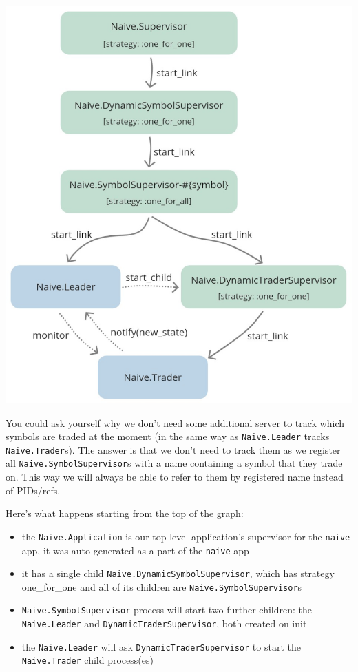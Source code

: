 \documentclass[
  oneside]{book}
\providecommand{\tightlist}{%
  \setlength{\itemsep}{0pt}\setlength{\parskip}{0pt}}
\begin{document}
\begin{center}\includegraphics[width=0.7\linewidth]{images/chapter_05_05_full} \end{center}

You could ask yourself why we don't need some additional server to track which symbols are traded at the moment (in the same way as \texttt{Naive.Leader} tracks \texttt{Naive.Trader}s). The answer is that we don't need to track them as we register all \texttt{Naive.SymbolSupervisor}s with a name containing a symbol that they trade on. This way we will always be able to refer to them by registered name instead of PIDs/refs.

Here's what happens starting from the top of the graph:

\begin{itemize}
\tightlist
\item
  the \texttt{Naive.Application} is our top-level application's supervisor for the \texttt{naive} app, it was auto-generated as a part of the \texttt{naive} app
\item
  it has a single child \texttt{Naive.DynamicSymbolSupervisor}, which has strategy one\_for\_one and all of its children are \texttt{Naive.SymbolSupervisor}s
\item
  \texttt{Naive.SymbolSupervisor} process will start two further children: the \texttt{Naive.Leader} and \texttt{DynamicTraderSupervisor}, both created on init
\item
  the \texttt{Naive.Leader} will ask \texttt{DynamicTraderSupervisor} to start the \texttt{Naive.Trader} child process(es)
\end{itemize}
\end{document}

